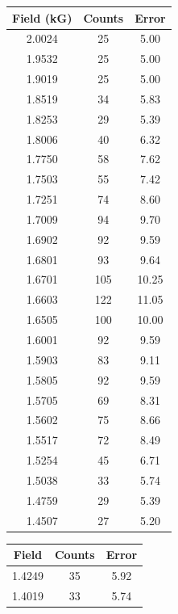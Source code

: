 \pagebreak
\begin{table}[t]
\begin{minipage}[b]{0.45\linewidth}\centering
\begin{tabular}{|c|c|c|} \hline
Field (kG)	&	Counts	&	Error	\\ \hline
2.0024	&	25	&	5.00	\\ \hline
1.9532	&	25	&	5.00	\\ \hline
1.9019	&	25	&	5.00	\\ \hline
1.8519	&	34	&	5.83	\\ \hline
1.8253	&	29	&	5.39	\\ \hline
1.8006	&	40	&	6.32	\\ \hline
1.7750	&	58	&	7.62	\\ \hline
1.7503	&	55	&	7.42	\\ \hline
1.7251	&	74	&	8.60	\\ \hline
1.7009	&	94	&	9.70	\\ \hline
1.6902	&	92	&	9.59	\\ \hline
1.6801	&	93	&	9.64	\\ \hline
1.6701	&	105	&	10.25	\\ \hline
1.6603	&	122	&	11.05	\\ \hline
1.6505	&	100	&	10.00	\\ \hline
1.6001	&	92	&	9.59	\\ \hline
1.5903	&	83	&	9.11	\\ \hline
1.5805	&	92	&	9.59	\\ \hline
1.5705	&	69	&	8.31	\\ \hline
1.5602	&	75	&	8.66	\\ \hline
1.5517	&	72	&	8.49	\\ \hline
1.5254	&	45	&	6.71	\\ \hline
1.5038	&	33	&	5.74	\\ \hline
1.4759	&	29	&	5.39	\\ \hline
1.4507	&	27	&	5.20	\\ \hline
\end{tabular}
\end{minipage}
\begin{minipage}[b]{0.45\linewidth}\centering
\begin{tabular}{|c|c|c|} \hline
Field	&	Counts	&	Error	\\ \hline
1.4249	&	35	&	5.92	\\ \hline
1.4019	&	33	&	5.74	\\ \hline

\end{tabular}
\end{minipage}
\end{table}
